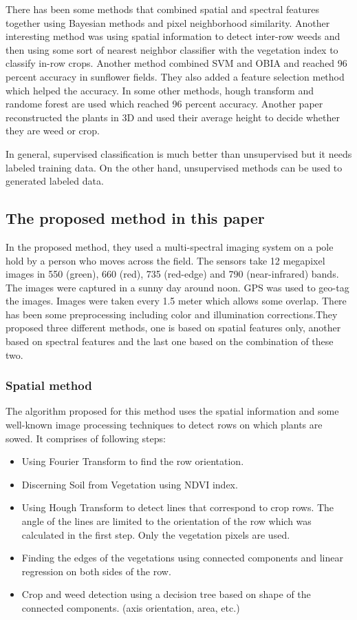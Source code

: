 \documentclass{article}
\begin{document}
	There has been some methods that combined spatial and spectral features together using Bayesian methods and pixel neighborhood similarity. Another interesting method was using spatial information to detect inter-row weeds and then using some sort of nearest neighbor classifier with the vegetation index to classify in-row crops. Another method combined SVM and OBIA and reached 96 percent accuracy in sunflower fields. They also added a feature selection method which helped the accuracy. In some other methods, hough transform and randome forest are used which reached 96 percent accuracy. Another paper reconstructed the plants in 3D and used their average height to decide whether they are weed or crop. 
	
	In general, supervised classification is much better than unsupervised but it needs labeled training data. On the other hand, unsupervised methods can be used to generated labeled data. 
	
	\subsection{The proposed method in this paper}
	
	In the proposed method, they used a multi-spectral imaging system on a pole hold by a person who moves across the field. The sensors take 12 megapixel images in 550 (green), 660 (red), 735 (red-edge) and 790 (near-infrared) bands. The images were captured in a sunny day around noon. GPS was used to geo-tag the images. Images were taken every 1.5 meter which allows some overlap. There has been some preprocessing including color and illumination corrections.They proposed three different methods, one is based on spatial features only, another based on spectral features and the last one based on the combination of these two.
	
	\subsubsection{Spatial method}
	
	The algorithm proposed for this method uses the spatial information and some well-known image processing techniques to detect rows on which plants are sowed. It comprises of following steps:
	
	\begin{itemize}
		\item Using Fourier Transform to find the row orientation.
		\item Discerning Soil from Vegetation using NDVI index. 
		\item Using Hough Transform to detect lines that correspond to crop rows. The angle of the lines are limited to the orientation of the row which was calculated in the first step. Only the vegetation pixels are used.
		\item Finding the edges of the vegetations using connected components and linear regression on both sides of the row. 
		\item Crop and weed detection using a decision tree based on shape of the connected components. (axis orientation, area, etc.)
	\end{itemize}
	
	


	
\end{document}
